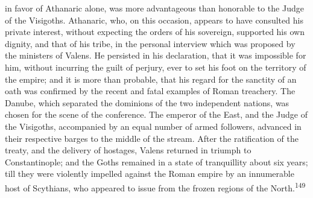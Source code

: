 in favor of Athanaric alone, was more advantageous than honorable
to the Judge of the Visigoths. Athanaric, who, on this occasion,
appears to have consulted his private interest, without expecting
the orders of his sovereign, supported his own dignity, and that
of his tribe, in the personal interview which was proposed by the
ministers of Valens. He persisted in his declaration, that it was
impossible for him, without incurring the guilt of perjury, ever
to set his foot on the territory of the empire; and it is more
than probable, that his regard for the sanctity of an oath was
confirmed by the recent and fatal examples of Roman treachery.
The Danube, which separated the dominions of the two independent
nations, was chosen for the scene of the conference. The emperor
of the East, and the Judge of the Visigoths, accompanied by an
equal number of armed followers, advanced in their respective
barges to the middle of the stream. After the ratification of the
treaty, and the delivery of hostages, Valens returned in triumph
to Constantinople; and the Goths remained in a state of
tranquillity about six years; till they were violently impelled
against the Roman empire by an innumerable host of Scythians, who
appeared to issue from the frozen regions of the North.\textsuperscript{149}



